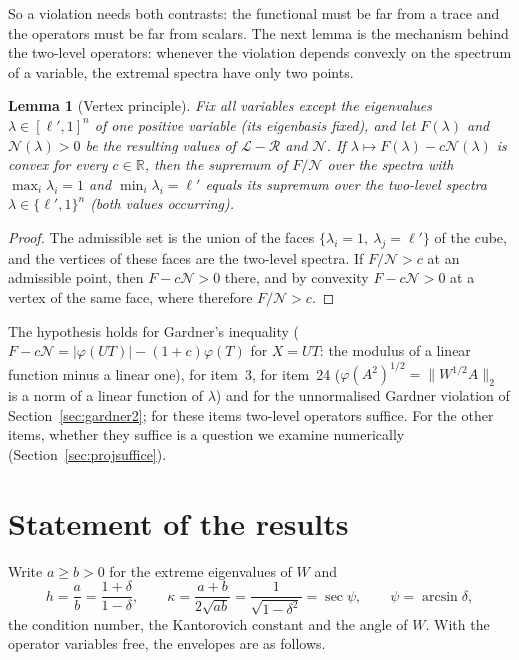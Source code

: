 \documentclass[11pt]{article}
\newcommand{\R}{\mathbb{R}}
\newcommand{\cL}{\mathcal{L}}
\newcommand{\cR}{\mathcal{R}}
\newcommand{\cN}{\mathcal{N}}
\theoremstyle{plain}
\newtheorem{lemma}[theorem]{Lemma}
\theoremstyle{definition}
\theoremstyle{remark}
\begin{document}
So a violation needs both contrasts: the functional must be far from a trace and the operators must be far from scalars.
The next lemma is the mechanism behind the two-level operators: whenever the violation depends convexly on the spectrum of a
variable, the extremal spectra have only two points.

\begin{lemma}[Vertex principle]\label{lem:vertex}
Fix all variables except the eigenvalues $\lambda\in[\ell',1]^n$ of one positive variable (its eigenbasis fixed), and let
$F(\lambda)$ and $\cN(\lambda)>0$ be the resulting values of $\cL-\cR$ and $\cN$. If $\lambda\mapsto F(\lambda)-c\cN(\lambda)$ is convex for
every $c\in\R$, then the supremum of $F/\cN$ over the spectra with $\max_i\lambda_i=1$ and $\min_i\lambda_i=\ell'$ equals its
supremum over the two-level spectra $\lambda\in\{\ell',1\}^n$ (both values occurring).
\end{lemma}
\begin{proof}
The admissible set is the union of the faces $\{\lambda_i=1,\ \lambda_j=\ell'\}$ of the cube, and the vertices of these faces are
the two-level spectra. If $F/\cN>c$ at an admissible point, then $F-c\cN>0$ there, and by convexity $F-c\cN>0$ at a vertex
of the same face, where therefore $F/\cN>c$.
\end{proof}

\noindent The hypothesis holds for Gardner's inequality ($F-c\cN=|\varphi(UT)|-(1+c)\varphi(T)$ for $X=UT$: the modulus of a
linear function minus a linear one), for item~3, for item~24 ($\varphi(A^2)^{1/2}=\|W^{1/2}A\|_2$ is a norm of a linear
function of $\lambda$) and for the unnormalised Gardner violation of Section~\ref{sec:gardner2}; for these items two-level
operators suffice. For the other items, whether they suffice is a question we examine numerically
(Section~\ref{sec:projsuffice}).

\section{Statement of the results}\label{sec:results}

Write $a\ge b>0$ for the extreme eigenvalues of $W$ and
\[
  h=\frac ab=\frac{1+\delta}{1-\delta},\qquad \kappa=\frac{a+b}{2\sqrt{ab}}=\frac1{\sqrt{1-\delta^2}}=\sec\psi,\qquad
  \psi=\arcsin\delta,
\]
the condition number, the Kantorovich constant and the angle of $W$. With the operator variables free, the envelopes are
as follows.
\end{document}
